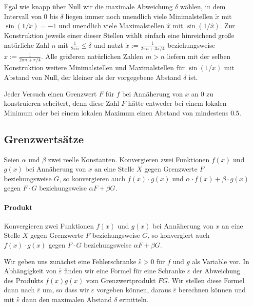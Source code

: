 \documentclass{article}
\let\l\left\let\r\right\let\cs\csname\let\ecs\endcsname\let\ea\expandafter
\let\eps\varepsilon
\begin{document}
Egal wie knapp über Null wir die maximale Abweichung $\delta$ wählen,
in dem Intervall von 0 bis $\delta$ liegen immer noch unendlich viele
Minimalstellen $\check x$ mit $\sin\l(1/\check x\r)=-1$ und unendlich
viele Maximalstellen $\hat x$ mit $\sin\l(1/\hat x\r)$.  Zur
Konstruktion jeweils einer dieser Stellen wählt einfach eine
hinreichend große natürliche Zahl $n$ mit $\frac1{2\pi n} \leq \delta$
und nutzt $\check x := \frac1{2\pi n +3\pi/4}$ beziehungsweise
$\hat x := \frac1{2\pi n +\pi/4}$. Alle größeren natürlichen Zahlen
$m>n$ liefern mit der selben Konstruktion weitere Minimalstellen und
Maximalstellen für $\sin(1/x)$ mit Abstand von Null, der kleiner als
der vorgegebene Abstand $\delta$ ist.

Jeder Versuch einen Grenzwert $F$ für $f$ bei Annäherung von $x$ an 0
zu konstruieren scheitert, denn diese Zahl $F$ hätte entweder bei
einem lokalen Minimum oder bei einem lokalen Maximum einen Abstand von mindestens $0.5$.

\subsection{Grenzwertsätze}
\label{sec:limit:theorems}
Seien $\alpha$ und $\beta$ zwei reelle Konstanten.  Konvergieren zwei
Funktionen $f(x)$ und $g(x)$ bei Annäherung von $x$ an eine Stelle $X$
gegen Grenzwerte $F$ beziehungsweise $G$, so konvergieren auch
$f(x)\cdot g(x)$ und $\alpha\cdot f(x)+\beta\cdot g(x)$ gegen
$F\cdot G$ beziehungsweise $\alpha F +\beta G$.

\paragraph{Produkt}
Konvergieren zwei Funktionen $f(x)$ und $g(x)$ bei Annäherung von $x$
an eine Stelle $X$ gegen Grenzwerte $F$ beziehungsweise $G$, so
konvergiert auch $f(x)\cdot g(x)$ gegen $F\cdot G$ beziehungsweise
$\alpha F +\beta G$.

Wir geben uns zunächst eine Fehlerschranke $\bar\eps>0$ für $f$ und
$g$ als Variable vor.  In Abhängigkeit von $\bar\eps$ finden wir eine
Formel für eine Schranke $\eps$ der Abweichung des Produkts $f(x)g(x)$
vom Grenzwertprodukt $FG$. Wir stellen diese Formel dann nach
$\bar\eps$ um, so dass wir $\eps$ vorgeben können, daraus $\bar\eps$
berechnen können und mit $\bar\eps$ dann den maximalen Abstand
$\delta$ ermitteln.
\end{document}
